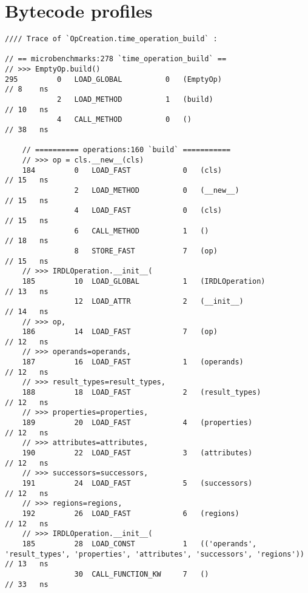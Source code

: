 \chapter{Bytecode profiles}
\label{chap:bytecode-profiles}




\vspace{2em}
\begin{code}
    \begin{verbatim}
//// Trace of `OpCreation.time_operation_build` :

// == microbenchmarks:278 `time_operation_build` ==
// >>> EmptyOp.build()
295         0   LOAD_GLOBAL          0   (EmptyOp)                                          // 8    ns
            2   LOAD_METHOD          1   (build)                                            // 10   ns
            4   CALL_METHOD          0   ()                                                 // 38   ns

    // ========== operations:160 `build` ===========
    // >>> op = cls.__new__(cls)
    184         0   LOAD_FAST            0   (cls)                                          // 15   ns
                2   LOAD_METHOD          0   (__new__)                                      // 15   ns
                4   LOAD_FAST            0   (cls)                                          // 15   ns
                6   CALL_METHOD          1   ()                                             // 18   ns
                8   STORE_FAST           7   (op)                                           // 15   ns
    // >>> IRDLOperation.__init__(
    185         10  LOAD_GLOBAL          1   (IRDLOperation)                                // 13   ns
                12  LOAD_ATTR            2   (__init__)                                     // 14   ns
    // >>> op,
    186         14  LOAD_FAST            7   (op)                                           // 12   ns
    // >>> operands=operands,
    187         16  LOAD_FAST            1   (operands)                                     // 12   ns
    // >>> result_types=result_types,
    188         18  LOAD_FAST            2   (result_types)                                 // 12   ns
    // >>> properties=properties,
    189         20  LOAD_FAST            4   (properties)                                   // 12   ns
    // >>> attributes=attributes,
    190         22  LOAD_FAST            3   (attributes)                                   // 12   ns
    // >>> successors=successors,
    191         24  LOAD_FAST            5   (successors)                                   // 12   ns
    // >>> regions=regions,
    192         26  LOAD_FAST            6   (regions)                                      // 12   ns
    // >>> IRDLOperation.__init__(
    185         28  LOAD_CONST           1   (('operands', 'result_types', 'properties', 'attributes', 'successors', 'regions'))  // 13   ns
                30  CALL_FUNCTION_KW     7   ()                                             // 33   ns


\end{verbatim}
\end{code}
